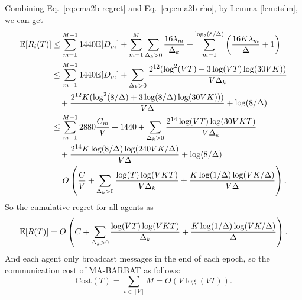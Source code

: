 Combining Eq.~\eqref{eq:cma2b-regret} and Eq.~\eqref{eq:cma2b-rho}, by Lemma \ref{lem:tslm}, we can get
\begin{equation*}
    \begin{split}
        {\mathbb{E}}[R_i(T)]
        &\leq \sum_{m=1}^{M-1} 1440 {\mathbb{E}}[D_m] + \sum_{m=1}^M \sum_{\Delta_k > 0}\frac{16\lambda_m}{\Delta_k} + \sum_{m=1}^{\log_2(8/\Delta)}\left(\frac{16K\lambda_m}{\Delta} + 1\right)\\
        &\leq \sum_{m=1}^{M-1} 1440 {\mathbb{E}}[D_m] + \sum_{\Delta_k > 0}\frac{2^{12}(\log^2(VT) + 3\log(VT)\log(30VK))}{V\Delta_k} \\
        &\quad + \frac{2^{12}K(\log^2(8/\Delta) + 3\log(8/\Delta)\log(30VK)))}{V\Delta} + \log(8/\Delta) \\
        &\leq \sum_{m=1}^{M-1} 2880 \frac{C_m}{V} + 1440 + \sum_{\Delta_k > 0}\frac{2^{14}\log(VT)\log(30VKT)}{V\Delta_k} \\
        &\quad+ \frac{2^{14}K\log(8/\Delta)\log(240VK / \Delta)}{V\Delta} + \log(8/\Delta)\\ 
        &= O\left(\frac{C}{V} + \sum_{\Delta_k > 0}\frac{\log(T)\log(VKT)}{V\Delta_k} + \frac{K\log(1 / \Delta)\log(VK / \Delta)}{V\Delta}\right).
    \end{split}
\end{equation*}
So the cumulative regret for all agents as
\[{\mathbb{E}}[R(T)] = O\left(C + \sum_{\Delta_k > 0}\frac{\log(VT)\log(VKT)}{\Delta_k} + \frac{K\log(1 / \Delta)\log(VK / \Delta)}{\Delta}\right).\]
And each agent only broadcast messages in the end of each epoch, so the communication cost of MA-BARBAT as follows:
\[\textrm{Cost}(T) = \sum_{v \in [V]} M = O(V\log(VT)).\]